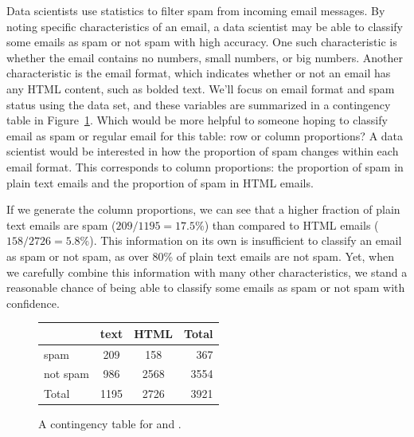 \begin{examplewrap}
\begin{nexample}{
    Data scientists use statistics to filter spam from incoming
    email messages.
    By noting specific characteristics of an email,
    a data scientist may be able to classify some emails as spam
    or not spam with high accuracy.
    One such characteristic is whether the email
    contains no numbers, small numbers, or big numbers.
    Another characteristic is the email format, which
    indicates whether or not an email has any HTML content,
    such as bolded text.
    We'll focus on email format and spam status using the
     data set, and these variables are summarized
    in a contingency table in
    Figure~\ref{emailSpamHTMLTableTotals}.
    Which would be more helpful to someone hoping to classify
    email as spam or regular email for this table:
    row or column proportions?}
  \label{weighingRowColumnProportions}
  A data scientist would be interested in how the proportion
  of spam changes within each email format.
  This corresponds to column proportions:
  the proportion of spam in plain text emails
  and the proportion of spam in HTML emails.

  If we generate the column proportions, we can see
  that a higher fraction of plain text emails are
  spam ($209/1195 = 17.5\%$)
  than compared to HTML emails ($158/2726 = 5.8\%$).
  This information on its own is insufficient to classify
  an email as spam or not spam, as over 80\% of plain text
  emails are not spam.
  Yet, when we carefully combine this information with many
  other characteristics,
  we stand a reasonable chance of being able to classify
  some emails as spam or not spam with confidence.
\end{nexample}
\end{examplewrap}

\begin{figure}[ht]
\centering
\begin{tabular}{l cc r}
  \hline
  & text & HTML & Total \\ 
  \hline
  spam & 209 & 158 & 367 \\ 
  not spam & 986 & 2568 & 3554 \\ 
  \hline
  Total & 1195 & 2726 & 3921 \\
  \hline
\end{tabular}
\caption{A contingency table for  and .}
\label{emailSpamHTMLTableTotals}
\end{figure}

